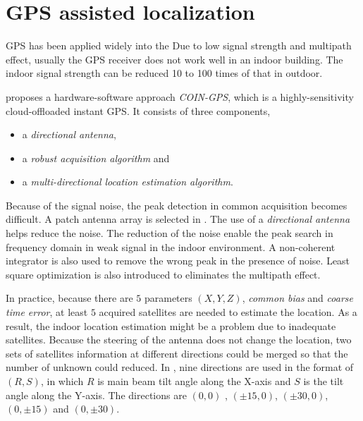 \documentclass[letterpaper]{article}
\begin{document}

\section{GPS assisted localization}
\label{sec:gps_local}

GPS has been applied widely into the 
Due to low signal strength and multipath effect, usually the GPS receiver does not work well in an indoor building.
The indoor signal strength can be reduced 10 to 100 times of that in outdoor.

\cite{Nirjon:2014:CIL:2594368.2594378} proposes a hardware-software approach \emph{COIN-GPS}, which is a highly-sensitivity cloud-offloaded instant GPS.
It consists of three components,
\begin{itemize}
	\item a \emph{directional antenna},
	\item a \emph{robust acquisition algorithm} and
	\item a \emph{multi-directional location estimation algorithm}.
\end{itemize}

Because of the signal noise, the peak detection in common acquisition becomes difficult.
A patch antenna array is selected in \cite{Nirjon:2014:CIL:2594368.2594378}.
The use of a \emph{directional antenna} helps reduce the noise.
The reduction of the noise enable the peak search in frequency domain in weak signal in the indoor environment.
A non-coherent integrator is also used to remove the wrong peak in the presence of noise.
Least square optimization is also introduced to eliminates the multipath effect.

In practice, because there are $ 5 $ parameters $ (X, Y, Z) $, \emph{common bias} and \emph{coarse time error}, at least $ 5 $ acquired satellites are needed to estimate the location.
As a result, the indoor location estimation might be a problem due to inadequate satellites.
Because the steering of the antenna does not change the location, two sets of satellites information at different directions could be merged so that the number of unknown could reduced.
In \cite{Nirjon:2014:CIL:2594368.2594378}, nine directions are used in the format of $ (R, S) $, in which $ R $ is main beam tilt angle along the X-axis and $ S $ is the tilt angle along the Y-axis.
The directions are $ (0, 0) $ , $ (\pm 15, 0) $, $ (\pm 30, 0) $, $ (0, \pm 15) $ and $ (0, \pm 30) $.
\end{document}
